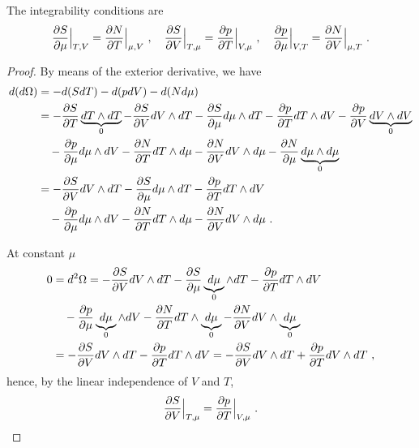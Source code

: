     The integrability conditions are 
    \begin{equation}\label{intcondom}
        \frac{\partial S}{\partial\mu} \Big \vert_{T,V} = \frac{\partial N}{\partial T} \Big \vert_{\mu,V} ~, \quad 
        \frac{\partial S}{\partial V} \Big \vert_{T,\mu} = \frac{\partial p}{\partial T} \Big \vert_{V, \mu} ~, \quad 
        \frac{\partial p}{\partial\mu} \Big \vert_{V,T} = \frac{\partial N}{\partial V} \Big \vert_{\mu, T} ~. 
    \end{equation}
    \begin{proof}
        By means of the exterior derivative, we have 
        \begin{equation*}
        \begin{aligned}
            d (d\Omega) & = - d (S dT) - d (p dV) - d (N d\mu) \\ & = - \frac{\partial S}{\partial T} \underbrace{dT \wedge dT}_0 - \frac{\partial S}{\partial V} dV \wedge dT - \frac{\partial S}{\partial\mu} d\mu \wedge dT - \frac{\partial p}{\partial T} dT \wedge dV - \frac{\partial p}{\partial V} \underbrace{dV \wedge dV}_0 \\ & \quad - \frac{\partial p}{\partial\mu} d\mu \wedge dV - \frac{\partial N}{\partial T} dT \wedge d\mu - \frac{\partial N}{\partial V} dV \wedge d\mu - \frac{\partial N}{\partial\mu} \underbrace{d\mu \wedge d\mu}_0 \\ & = - \frac{\partial S}{\partial V} dV \wedge dT - \frac{\partial S}{\partial\mu} d\mu \wedge dT - \frac{\partial p}{\partial T} dT \wedge dV \\ & \quad - \frac{\partial p}{\partial\mu} d\mu \wedge dV - \frac{\partial N}{\partial T} dT \wedge d\mu - \frac{\partial N}{\partial V} dV \wedge d\mu ~.
        \end{aligned}
        \end{equation*}

        At constant $\mu$ 
        \begin{equation*}
        \begin{aligned}
            0 & = d^2 \Omega = - \frac{\partial S}{\partial V} dV \wedge dT - \frac{\partial S}{\partial\mu} \underbrace{d\mu}_0 \wedge dT - \frac{\partial p}{\partial T} dT \wedge dV \\ & \quad - \frac{\partial p}{\partial\mu} \underbrace{d\mu}_0 \wedge dV - \frac{\partial N}{\partial T} dT \wedge \underbrace{d\mu}_0 - \frac{\partial N}{\partial V} dV \wedge \underbrace{d\mu}_0 \\ & = - \frac{\partial S}{\partial V} dV \wedge dT - \frac{\partial p}{\partial T} dT \wedge dV = - \frac{\partial S}{\partial V} dV \wedge dT + \frac{\partial p}{\partial T} dV \wedge dT ~,
        \end{aligned}
        \end{equation*}
        hence, by the linear independence of $V$ and $T$,
        \begin{equation*}
            \frac{\partial S}{\partial V} \Big \vert_{T,\mu} = \frac{\partial p}{\partial T} \Big \vert_{V, \mu} ~.
        \end{equation*}


\end{proof}

